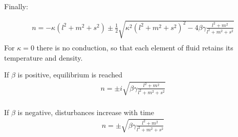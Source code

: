 \documentclass[11pt]{article}
\begin{document}
Finally:

\begin{equation}\begin{aligned}
n = -\kappa (l^2 +m^2+s^2) \pm \frac{1}{2} \sqrt{\kappa^2 (l^2 +m^2+s^2)^2-4 \beta \gamma \frac{l^2 + m^2}{l^2 + m^2 + s^2}}  \\
\end{aligned} \end{equation}
For $\kappa=0$ there is no conduction, so that each element of fluid retains its temperature and density.

If $\beta$ is positive, equilibrium is reached
\begin{equation}\begin{aligned}
n = \pm i \sqrt{\beta \gamma \frac{l^2 + m^2}{l^2 + m^2 + s^2}}  \\
\end{aligned} \end{equation}

If $\beta$ is negative, disturbances increase with time
\begin{equation}\begin{aligned}
n = \pm \sqrt{\beta \gamma \frac{l^2 + m^2}{l^2 + m^2 + s^2}}  \\
\end{aligned} \end{equation}
\end{document}
